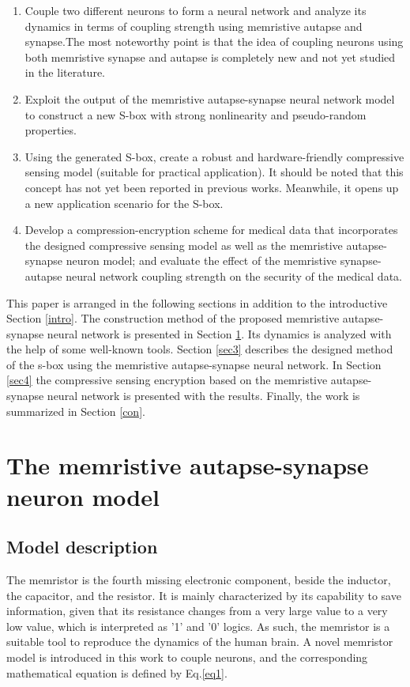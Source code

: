 \documentclass[journal]{IEEEtran/IEEEtran}
\begin{document}
\begin{enumerate}
\item  Couple two different neurons to form a neural network and analyze its dynamics in terms of coupling strength using memristive autapse and synapse.The most noteworthy point is that the idea of coupling neurons using both memristive synapse and autapse is completely new and not yet studied in the literature.
\item Exploit the output of the memristive autapse-synapse neural network model to construct a new S-box with strong nonlinearity and pseudo-random properties.
\item Using the generated S-box, create a robust and hardware-friendly compressive sensing model (suitable for practical application). It should be noted that this concept has not yet been reported in previous works. Meanwhile, it opens up a new application scenario for the S-box.
\item Develop a compression-encryption scheme for medical data that incorporates the designed compressive sensing model as well as the memristive autapse-synapse neuron model; and evaluate the effect of the memristive synapse-autapse neural network coupling strength on the security of the medical data. 
\end{enumerate} 
This paper is arranged in the following sections in addition to the introductive Section \ref{intro}. The construction method of the proposed memristive autapse-synapse neural network is presented in Section \ref{dm}. Its dynamics is analyzed with the help of some well-known tools. Section \ref{sec3} describes the designed method of the s-box using the memristive autapse-synapse neural network. In Section \ref{sec4} the compressive sensing encryption based on the memristive autapse-synapse neural network is presented with the results. Finally, the work is summarized in Section \ref{con}.




\section{The memristive autapse-synapse neuron model}
\label{dm}
\subsection{Model description}

The memristor is the fourth missing electronic component, beside the inductor, the capacitor, and the resistor. It is mainly characterized by its capability to save information, given that its resistance changes from a very large value to a very low value, which is interpreted as '1' and '0' logics. As such, the memristor is a suitable tool to reproduce the dynamics of the human brain. A novel memristor model is introduced in this work to couple neurons, and the corresponding mathematical equation is defined by Eq.\ref{eq1}.
\end{document}
